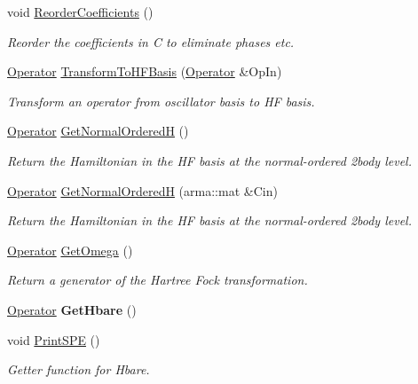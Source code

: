 \begin{DoxyCompactItemize}
void \hyperlink{classHartreeFock_a2eb6754f57250a03a2e1bd3e2aef4daf}{Reorder\+Coefficients} ()
\begin{DoxyCompactList}\small\item\em Reorder the coefficients in C to eliminate phases etc. \end{DoxyCompactList}\item 
\hyperlink{classOperator}{Operator} \hyperlink{classHartreeFock_a55914915cea16669e549025c244b62d0}{Transform\+To\+H\+F\+Basis} (\hyperlink{classOperator}{Operator} \&Op\+In)
\begin{DoxyCompactList}\small\item\em Transform an operator from oscillator basis to HF basis. \end{DoxyCompactList}\item 
\hyperlink{classOperator}{Operator} \hyperlink{classHartreeFock_a17bdb52033e2f62bba72ea86bc196b37}{Get\+Normal\+OrderedH} ()
\begin{DoxyCompactList}\small\item\em Return the Hamiltonian in the HF basis at the normal-\/ordered 2body level. \end{DoxyCompactList}\item 
\mbox{\label{classHartreeFock_ad7da4e35f14128c1c0becf204e15a4e1}} 
\hyperlink{classOperator}{Operator} \hyperlink{classHartreeFock_ad7da4e35f14128c1c0becf204e15a4e1}{Get\+Normal\+OrderedH} (arma\+::mat \&Cin)
\begin{DoxyCompactList}\small\item\em Return the Hamiltonian in the HF basis at the normal-\/ordered 2body level. \end{DoxyCompactList}\item 
\hyperlink{classOperator}{Operator} \hyperlink{classHartreeFock_a53011b381945ed5c61f50b209db5bf64}{Get\+Omega} ()
\begin{DoxyCompactList}\small\item\em Return a generator of the Hartree Fock transformation. \end{DoxyCompactList}\item 
\mbox{\label{classHartreeFock_a7f2a07edc3ccaa0cf9bbc0faadfd9ddf}} 
\hyperlink{classOperator}{Operator} {\bfseries Get\+Hbare} ()
\item 
void \hyperlink{classHartreeFock_ab96b85eca26bf7c57430242201066932}{Print\+S\+PE} ()
\begin{DoxyCompactList}\small\item\em Getter function for Hbare. \end{DoxyCompactList}\item 

\end{DoxyCompactItemize}
